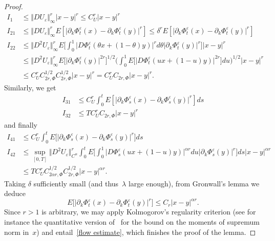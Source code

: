 \documentclass[a4paper,10pt]{article}
\newcommand\1{\mathbbm{1}}
\newcommand{\eps}{\varepsilon}
\numberwithin{equation}{section}
\begin{document}
\begin{proof}
\begin{align*}
I_{1} & \leq\Vert DU_{\varepsilon}\Vert _{\infty}^{r}\vert
x-y\vert ^{r}\leq C_{U}^{r}\vert x-y\vert ^{r} \\[0.1cm]
I_{21} & \leq\Vert DU_{\varepsilon}\Vert _{\infty}^{r}E[
\vert \partial_{k}\Phi^{\eps}_{t}(x)  -\partial
_{k}\Phi^{\eps}_{t}(  y)  \vert ^{r}]  \leq
\delta^{r}E[  \vert \partial_{k}\Phi^{\eps}_{t}(
x)  -\partial_{k}\Phi^{\eps}_{t}(  y)  \vert
^{r}] \\
I_{22} & \leq\Vert D^{2}U_{\varepsilon}\Vert _{\infty}^{r}E \Big[
\int_{0}^{1}\vert D\Phi^{\eps}_{t}(  \theta x+(  1-\theta)
y)  \vert ^{r}d\theta\vert \partial_{k}\Phi^{\eps}_{t}(
y)  \vert ^{r}\Big]  \vert x-y\vert ^{r}\\
& \leq\Vert D^{2}U_{\varepsilon}\Vert _{\infty}^{r}E \Big[
\vert \partial_{k}\Phi^{\eps}_{t}(  y)  \vert
^{2r}\Big]  ^{1/2} \Big(  \int_{0}^{1}E \big[ \vert D\Phi
^{\eps}_{t}(  ux+(  1-u)  y)  \vert
^{2r} \big]  du\Big)  ^{1/2}\vert x-y\vert ^{r}\\
& \leq C_{U}^{r}C_{2r,\Phi}^{1/2}C_{2r,\Phi}^{1/2}\vert
x-y\vert ^{r}=C_{U}^{r}C_{2r,\Phi}\vert x-y\vert ^{r} .
\end{align*}
Similarly, we get
\begin{align*}
I_{31} & \leq C_{U}^{r}\int_{0}^{t}E[  \vert \partial_{k} 
\Phi^{\eps}_{s}(x)  -\partial_{k}\Phi^{\eps}_{s}(
y)  \vert ^{r}]  ds \\
I_{32} & \leq TC_{U}^{r}C_{2r,\Phi}\vert x-y\vert ^{r} 
\end{align*}
and finally
\begin{align*}
I_{41} & \leq C_{U}^{r}\int_{0}^{t}E \big[  \vert \partial_{k}\Phi
^{\eps}_{s}(x)  -\partial_{k}\Phi^{\eps}_{s}(
y)  \vert ^{r}\big]  ds \\
I_{42}  & \leq\sup_{[0,T]  }\Vert D^{2}U_{\varepsilon
}\Vert _{C^{\alpha}}^{r}\int_{0}^{t}E \Big[  \int_{0}^{1}\vert
D\Phi^{\eps}_{s}(  ux+(  1-u)  y)  \vert
^{\alpha r}du\vert \partial_{k}\Phi^{\eps}_{s}(  y)
\vert ^{r}\Big]  ds\vert x-y\vert ^{\alpha r}\\
& \leq TC_{U}^{r}C_{2\alpha r,\Phi}^{1/2}C_{2r,\Phi}^{1/2}\vert
x-y\vert ^{\alpha r}.
\end{align*}
Taking $\delta$ sufficiently small (and thus~$\lambda$ large enough), from Gronwall's lemma we deduce
\begin{equation*}
E\big[  \vert \partial_{k}\Phi^{\eps}_{t}(x)
-\partial_{k}\Phi^{\eps}_{t}(  y)  \vert ^{r}\big]
\leq C_{r}\vert x-y\vert ^{\alpha r}.
\end{equation*}
Since $r>1$ is arbitrary, we may apply Kolmogorov's regularity criterion (see for instance the quantitative version of~\cite{KUNITA84} for the bound on the moments of supremum norm in~$x$) and entail~\eqref{flow estimate}, which finishes the proof of the lemma.
\end{proof}
\end{document}
